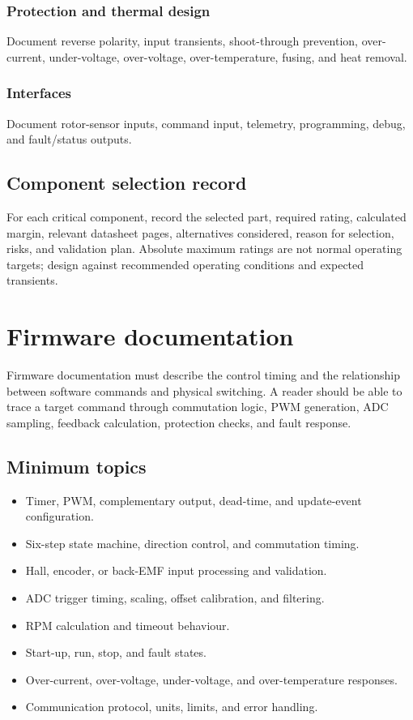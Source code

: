 \documentclass[11pt,a4paper]{article}
\begin{document}
\subsubsection{Protection and thermal design}
Document reverse polarity, input transients, shoot-through prevention,
over-current, under-voltage, over-voltage, over-temperature, fusing, and heat
removal.

\subsubsection{Interfaces}
Document rotor-sensor inputs, command input, telemetry, programming, debug,
and fault/status outputs.

\subsection{Component selection record}

For each critical component, record the selected part, required rating,
calculated margin, relevant datasheet pages, alternatives considered, reason
for selection, risks, and validation plan. Absolute maximum ratings are not
normal operating targets; design against recommended operating conditions and
expected transients.

\section{Firmware documentation}

Firmware documentation must describe the control timing and the relationship
between software commands and physical switching. A reader should be able to
trace a target command through commutation logic, PWM generation, ADC
sampling, feedback calculation, protection checks, and fault response.

\subsection{Minimum topics}

\begin{itemize}
  \item Timer, PWM, complementary output, dead-time, and update-event configuration.
  \item Six-step state machine, direction control, and commutation timing.
  \item Hall, encoder, or back-EMF input processing and validation.
  \item ADC trigger timing, scaling, offset calibration, and filtering.
  \item RPM calculation and timeout behaviour.
  \item Start-up, run, stop, and fault states.
  \item Over-current, over-voltage, under-voltage, and over-temperature responses.
  \item Communication protocol, units, limits, and error handling.
\end{itemize}
\end{document}
